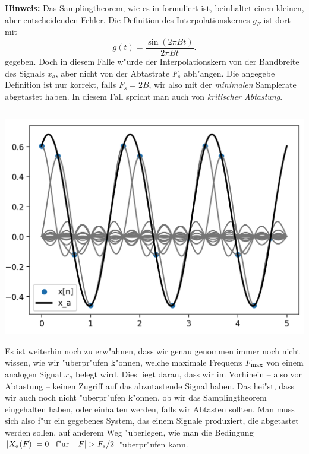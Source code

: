 \textbf{Hinweis:} Das Samplingtheorem, wie es in \cite{proakis2013} formuliert ist, beinhaltet einen kleinen, aber entscheidenden Fehler. Die Definition des Interpolationskernes $g_F$ ist dort mit
\[
g(t) = \frac{\sin(2 \pi B t)}{2 \pi B t}.
\]
gegeben. 
Doch in diesem Falle w"urde der Interpolationskern von der Bandbreite des Signals $x_a$, aber nicht von der Abtastrate $F_s$ abh"angen. 
Die angegebe Definition ist nur korrekt, falls $F_s = 2 B$, wir also mit der \emph{minimalen} Samplerate abgetastet haben.
In diesem Fall spricht man auch von \emph{kritischer Abtastung}.
%
\begin{listing}
    \begin{minipage}{0.49\textwidth}
        \strut\vspace*{-\baselineskip}\newline
        \inputminted[firstline=4]{python3}{code/sampling_theorem.py}
    \end{minipage}
    \begin{minipage}{0.49\textwidth}
        \strut\vspace*{-\baselineskip}\newline
        \includegraphics[width=\textwidth]{code/sampling_theorem.png}
    \end{minipage}
    \label{py:sampling_theorem}
\end{listing}

Es ist weiterhin noch zu erw"ahnen, dass wir genau genommen immer noch nicht wissen, wie wir "uberpr"ufen k"onnen, welche maximale Frequenz $F_{\rm max}$ von einem analogen Signal $x_a$ belegt wird.
Dies liegt daran, dass wir im Vorhinein -- also vor Abtastung -- keinen Zugriff auf das abzutastende Signal haben.
Das hei"st, dass wir auch noch nicht "uberpr"ufen k"onnen, ob wir das Samplingtheorem eingehalten haben, oder einhalten werden, falls wir Abtasten sollten.
Man muss sich also f"ur ein gegebenes System, das einem Signale produziert, die abgetastet werden sollen, auf anderem Weg "uberlegen, wie man die Bedingung ${\left| X_a(F) \right|} = 0 {\hspace{3mm} \text{f"ur} \hspace{3mm}} {\left| F \right|} > F_s/2$ "uberpr"ufen kann.

\FloatBarrier
